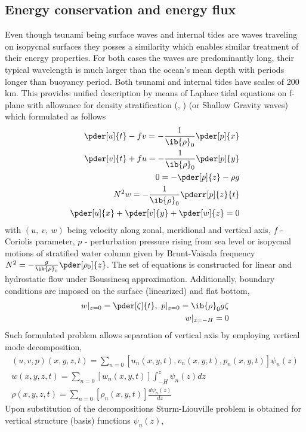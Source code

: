 \subsection{Energy conservation and energy flux}
Even though tsunami being surface waves and internal tides are waves traveling on isopycnal surfaces they posses a similarity which enables similar treatment of their energy properties. For both cases the waves are predominantly long, their typical wavelength is much larger than the ocean's mean depth with periods longer than buoyancy period. Both tsunami and internal tides have scales of 200 km. This provides unified description by means of Laplace tidal equations on f-plane with allowance for density stratification (\cite{kundu2008fluid}, \cite{cushman2011introduction}) (or Shallow Gravity waves) which formulated as follows
\begin{align}
\pder[u]{t} - f v = -\frac{1}{\ib{\rho}_0}\pder[p]{x}\\
\pder[v]{t} + f u = -\frac{1}{\ib{\rho}_0}\pder[p]{y}\\
0 = -\pder[p]{z} - \rho g\\
N^2 w = -\frac{1}{\ib{\rho}_0} \pderr[p]{z}{t}\\
\pder[u]{x} + \pder[v]{y} + \pder[w]{z} = 0
\end{align}
with $(u,~v,~w)$ being velocity along zonal, meridional and vertical axis, $f$ - Coriolis parameter, $p$ - perturbation pressure rising from sea level or isopycnal motions of stratified water column given by Brunt-Vaisala frequency $N^2 = -\frac{g}{\ib{\rho}_0}\pder[\rho_0]{z}$. The set of equations is constructed for linear and hydrostatic flow under Boussinesq approximation. Additionally, boundary conditions are imposed on the surface (linearized) and flat bottom,
\begin{align}
w|_{z = 0} = \pder[\zeta]{t},~p|_{z = 0} = \ib{\rho}_0 g \zeta\\
w|_{z = -H} = 0
\end{align}
Such formulated problem allows separation of vertical axis by employing vertical mode decomposition,
\begin{align}
(u, v, p)(x,y,z,t) = \sum_{n = 0} [u_n(x,y,t), v_n(x,y,t), p_n(x,y,t)]\psi_n(z)\\
w(x,y,z,t) = \sum_{n = 0} [w_n(x,y,t)] \int_{-H}^z \psi_n(z) dz\\
\rho(x,y,z,t) = \sum_{n = 0} [\rho_n(x,y,t)] \frac{d \psi_n(z)}{dz}
\end{align}
Upon substitution of the decompositions Sturm-Liouville problem is obtained for vertical structure (basis) functions $\psi_n(z)$,
